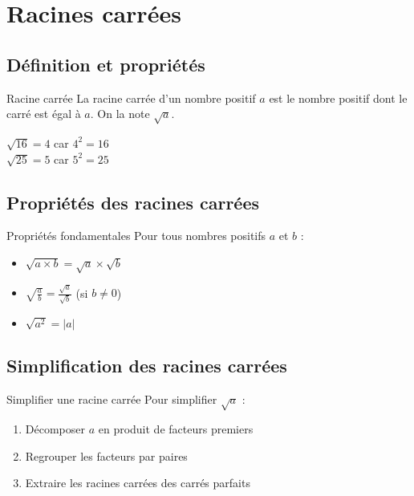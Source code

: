 \chapter{Racines carrées}

\section{Définition et propriétés}
\begin{definition}{Racine carrée}
La racine carrée d'un nombre positif $a$ est le nombre positif dont le carré est égal à $a$. On la note $\sqrt{a}$.
\end{definition}

\begin{exemple}
$\sqrt{16} = 4$ car $4^2 = 16$\\
$\sqrt{25} = 5$ car $5^2 = 25$
\end{exemple}

\section{Propriétés des racines carrées}
\begin{propriete}{Propriétés fondamentales}
Pour tous nombres positifs $a$ et $b$ :
\begin{itemize}
    \item $\sqrt{a \times b} = \sqrt{a} \times \sqrt{b}$
    \item $\sqrt{\frac{a}{b}} = \frac{\sqrt{a}}{\sqrt{b}}$ (si $b \neq 0$)
    \item $\sqrt{a^2} = |a|$
\end{itemize}
\end{propriete}

\section{Simplification des racines carrées}
\begin{methode}{Simplifier une racine carrée}
Pour simplifier $\sqrt{a}$ :
\begin{enumerate}
    \item Décomposer $a$ en produit de facteurs premiers
    \item Regrouper les facteurs par paires
    \item Extraire les racines carrées des carrés parfaits
\end{enumerate}
\end{methode}

